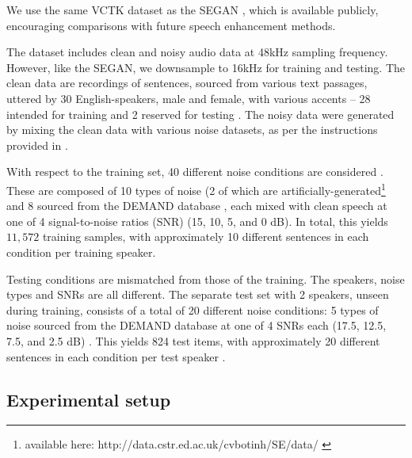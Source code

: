 \documentclass{article}
\begin{document}
We use the same VCTK dataset \citep{Valentini-Botinhao2017Noisysound} as the SEGAN \cite{Pascual2017}, which is available publicly, encouraging comparisons with future speech enhancement methods.

The dataset includes clean and noisy audio data at 48kHz sampling frequency.
However, like the SEGAN, we downsample to 16kHz for training and testing.
The clean data are recordings of sentences, sourced from various text passages, uttered by 30 English-speakers, male and female, with various accents – 28 intended for training and 2 reserved for testing \citep{Valentini-Botinhao2016SpeechNetworks}. 
The noisy data were generated by mixing the clean data with various noise datasets, as per the instructions provided in \citep{Pascual2017, Valentini-Botinhao2017Noisysound, Valentini-Botinhao+2016}. 

With respect to the training set, 40 different noise conditions are considered \citep{Pascual2017, Valentini-Botinhao2016SpeechNetworks}. 
These are composed of 10 types of noise (2 of which are artificially-generated\footnote{available here: http://data.cstr.ed.ac.uk/cvbotinh/SE/data/ \citep{Valentini-Botinhao2017Noisysound}} and 8 sourced from the DEMAND database \citep{Thiemann2013TheRecord-ings}, each mixed with clean speech at one of 4 signal-to-noise ratios (SNR) (15, 10, 5, and 0 dB). 
In total, this yields $11,572$ training samples, with approximately 10 different sentences in each condition per training speaker.

Testing conditions are mismatched from those of the training. The speakers, noise types and SNRs are all different. The separate test set with 2 speakers, unseen during training, consists of a total of 20 different noise conditions: 5 types of noise sourced from the DEMAND database at one of 4 SNRs each (17.5, 12.5, 7.5, and 2.5 dB) \citep{Valentini-Botinhao2017Noisysound, Valentini-Botinhao+2016}. This yields 824 test items, with approximately 20 different sentences in each condition per test speaker \citep{Valentini-Botinhao2017Noisysound, Valentini-Botinhao+2016}.


\subsection{Experimental setup}
\end{document}

